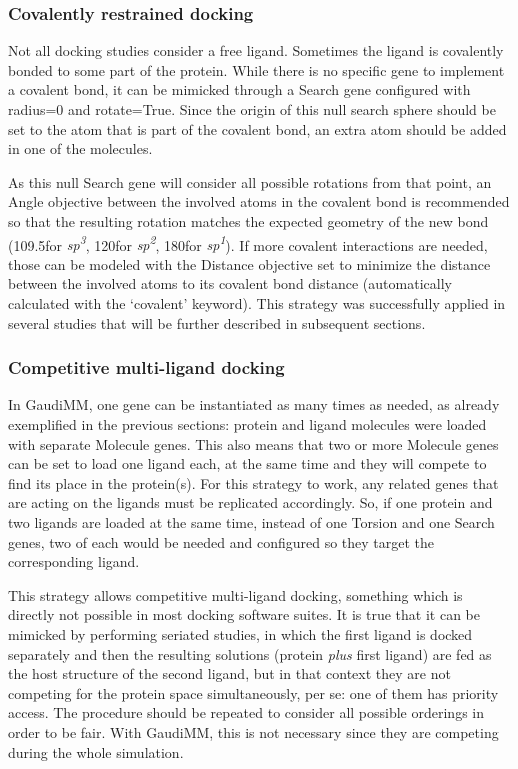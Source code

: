 \subsubsection{Covalently restrained docking}
Not all docking studies consider a free ligand. Sometimes the ligand is covalently bonded to some part of the protein. While there is no specific gene to implement a covalent bond, it can be mimicked through a Search gene configured with radius=0 and rotate=True. Since the origin of this null search sphere should be set to the atom that is part of the covalent bond, an extra atom should be added in one of the molecules.

As this null Search gene will consider all possible rotations from that point, an Angle objective between the involved atoms in the covalent bond is recommended so that the resulting rotation matches the expected geometry of the new bond (109.5\textdegree for \textit{sp\textsuperscript{3}}, 120\textdegree for \textit{sp\textsuperscript{2}}, 180\textdegree for \textit{sp\textsuperscript{1}}). If more covalent interactions are needed, those can be modeled with the Distance objective set to minimize the distance between the involved atoms to its covalent bond distance (automatically calculated with the ‘covalent’ keyword). This strategy was successfully applied in several studies that will be further described in subsequent sections.

\subsubsection{Competitive multi-ligand docking}
In GaudiMM, one gene can be instantiated as many times as needed, as already exemplified in the previous sections: protein and ligand molecules were loaded with separate Molecule genes. This also means that two or more Molecule genes can be set to load one ligand each, at the same time and they will compete to find its place in the protein(s). For this strategy to work, any related genes that are acting on the ligands must be replicated accordingly. So, if one protein and two ligands are loaded at the same time, instead of one Torsion and one Search genes, two of each would be needed and configured so they target the corresponding ligand.

This strategy allows competitive multi-ligand docking, something which is directly not possible in most docking software suites. It is true that it can be mimicked by performing seriated studies, in which the first ligand is docked separately and then the resulting solutions (protein \textit{plus} first ligand) are fed as the host structure of the second ligand, but in that context they are not competing for the protein space simultaneously, per se: one of them has priority access. The procedure should be repeated to consider all possible orderings in order to be fair. With GaudiMM, this is not necessary since they are competing during the whole simulation.

